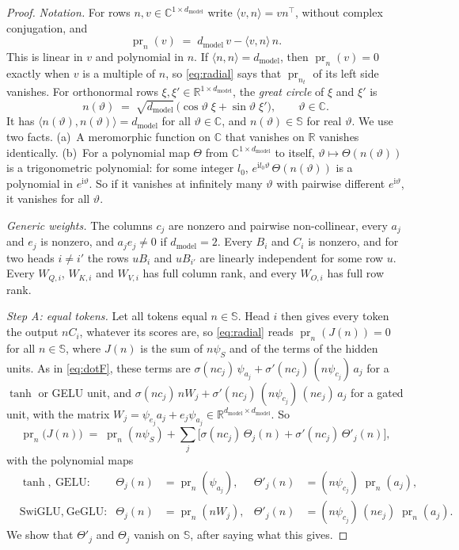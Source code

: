 \documentclass[10pt]{article}
\theoremstyle{definition}
\theoremstyle{remark}
\newcommand{\R}{\mathbb{R}}
\newcommand{\dm}{d_{\mathrm{model}}}
\begin{document}
\begin{proof}
\emph{Notation.} For rows $n, v \in \mathbb C^{1\times\dm}$ write $\langle v, n\rangle = vn^\top$, without complex conjugation, and
\[
\operatorname{pr}_n(v) \;=\; \dm\,v - \langle v, n\rangle\,n .
\]
This is linear in $v$ and polynomial in $n$. If $\langle n, n\rangle = \dm$, then $\operatorname{pr}_n(v) = 0$ exactly when $v$ is a multiple of $n$, so \eqref{eq:radial} says that $\operatorname{pr}_{n_t}$ of its left side vanishes. For orthonormal rows $\xi, \xi' \in \R^{1\times\dm}$, the \emph{great circle} of $\xi$ and $\xi'$ is
\[
n(\vartheta) \;=\; \sqrt{\dm}\,\big(\cos\vartheta\;\xi + \sin\vartheta\;\xi'\big), \qquad \vartheta \in \mathbb C .
\]
It has $\langle n(\vartheta), n(\vartheta)\rangle = \dm$ for all $\vartheta \in \mathbb C$, and $n(\vartheta) \in \mathbb S$ for real $\vartheta$. We use two facts. (a)~A meromorphic function on $\mathbb C$ that vanishes on $\R$ vanishes identically. (b)~For a polynomial map $\Theta$ from $\mathbb C^{1\times\dm}$ to itself, $\vartheta \mapsto \Theta(n(\vartheta))$ is a trigonometric polynomial: for some integer $l_0$, $e^{\mathrm il_0\vartheta}\,\Theta(n(\vartheta))$ is a polynomial in $e^{\mathrm i\vartheta}$. So if it vanishes at infinitely many $\vartheta$ with pairwise different $e^{\mathrm i\vartheta}$, it vanishes for all $\vartheta$.

\emph{Generic weights.} The columns $c_j$ are nonzero and pairwise non-collinear, every $a_j$ and $e_j$ is nonzero, and $a_je_j \neq 0$ if $\dm = 2$. Every $B_i$ and $C_i$ is nonzero, and for two heads $i \neq i'$ the rows $uB_i$ and $uB_{i'}$ are linearly independent for some row $u$. Every $W_{Q,i}$, $W_{K,i}$ and $W_{V,i}$ has full column rank, and every $W_{O,i}$ has full row rank.

\emph{Step A: equal tokens.} Let all tokens equal $n \in \mathbb S$. Head $i$ then gives every token the output $nC_i$, whatever its scores are, so \eqref{eq:radial} reads $\operatorname{pr}_n(J(n)) = 0$ for all $n \in \mathbb S$, where $J(n)$ is the sum of $n\psi_S$ and of the terms of the hidden units. As in \eqref{eq:dotF}, these terms are $\sigma(nc_j)\,\psi_{a_j} + \sigma'(nc_j)\,(n\psi_{c_j})\,a_j$ for a $\tanh$ or GELU unit, and $\sigma(nc_j)\,nW_j + \sigma'(nc_j)\,(n\psi_{c_j})\,(ne_j)\,a_j$ for a gated unit, with the matrix $W_j = \psi_{e_j}a_j + e_j\psi_{a_j} \in \R^{\dm\times\dm}$. So
\begin{equation}\label{eq:sphereA}
\operatorname{pr}_n\big(J(n)\big) \;=\; \operatorname{pr}_n(n\psi_S) + \sum_j\Big[\sigma(nc_j)\,\Theta_j(n) + \sigma'(nc_j)\,\Theta'_j(n)\Big],
\end{equation}
with the polynomial maps
\begin{align*}
&\tanh,\ \text{GELU:} & \Theta_j(n) &= \operatorname{pr}_n(\psi_{a_j}), & \Theta'_j(n) &= (n\psi_{c_j})\;\operatorname{pr}_n(a_j),\\
&\text{SwiGLU},\ \text{GeGLU:} & \Theta_j(n) &= \operatorname{pr}_n(nW_j), & \Theta'_j(n) &= (n\psi_{c_j})\,(ne_j)\;\operatorname{pr}_n(a_j).
\end{align*}
We show that $\Theta'_j$ and $\Theta_j$ vanish on $\mathbb S$, after saying what this gives.


\end{proof}
\end{document}
